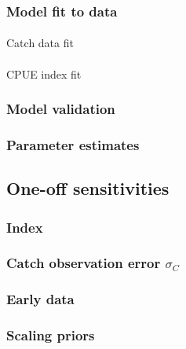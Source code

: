 \documentclass[
  11pt,
]{SCreport}
\makeatletter
\let\oldparagraph\paragraph
\renewcommand{\paragraph}{
    \@ifstar
      \xxxParagraphStar
      \xxxParagraphNoStar
  }
\newcommand{\xxxParagraphStar}[1]{\oldparagraph*{#1}\mbox{}}
\newcommand{\xxxParagraphNoStar}[1]{\oldparagraph{#1}\mbox{}}
\makeatother
\begin{document}
\subsubsection{Model fit to data}\label{sec-model-fit}

\paragraph{Catch data fit}\label{catch-data-fit}

\paragraph{CPUE index fit}\label{cpue-index-fit}

\subsubsection{Model validation}\label{sec-model-validation}

\subsubsection{Parameter estimates}\label{sec-parameter-estimates}

\subsection{One-off sensitivities}\label{sec-res-sens}

\subsubsection{Index}\label{sec-res-sens-index}

\subsubsection{\texorpdfstring{Catch observation error
\(\sigma_C\)}{Catch observation error \textbackslash sigma\_C}}\label{sec-res-sens-sigmac}

\subsubsection{Early data}\label{sec-res-sens-early}

\subsubsection{Scaling priors}\label{sec-res-sens-scaling}
\end{document}
